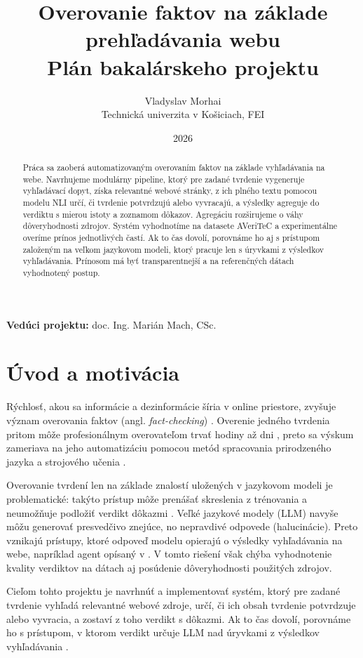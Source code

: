 \documentclass[a4paper,11pt]{article}
\title{Overovanie faktov na základe prehľadávania webu\\[0.4em]
\large Plán bakalárskeho projektu}
\author{Vladyslav Morhai\\
\small Technická univerzita v Košiciach, FEI}
\date{2026}
\begin{document}
\maketitle

\noindent\textbf{Vedúci projektu:} doc. Ing. Marián Mach, CSc.

\begin{abstract}
Práca sa zaoberá automatizovaným overovaním faktov na základe vyhľadávania
na webe. Navrhujeme modulárny pipeline, ktorý pre zadané tvrdenie vygeneruje
vyhľadávací dopyt, získa relevantné webové stránky, z ich plného textu
pomocou modelu NLI určí, či tvrdenie potvrdzujú alebo vyvracajú, a výsledky
agreguje do verdiktu s mierou istoty a zoznamom dôkazov. Agregáciu
rozširujeme o váhy dôveryhodnosti zdrojov. Systém vyhodnotíme na datasete
AVeriTeC a experimentálne overíme prínos jednotlivých častí. Ak to čas
dovolí, porovnáme ho aj s prístupom založeným na veľkom jazykovom modeli,
ktorý pracuje len s úryvkami z výsledkov vyhľadávania. Prínosom má byť
transparentnejší a na referenčných dátach vyhodnotený postup.
\end{abstract}

\section{Úvod a motivácia}

Rýchlosť, akou sa informácie a dezinformácie šíria v online priestore,
zvyšuje význam overovania faktov (angl. \textit{fact-checking})
\cite{guo2022survey}. Overenie jedného tvrdenia pritom môže profesionálnym
overovateľom trvať hodiny až dni \cite{guo2022survey}, preto sa výskum
zameriava na jeho automatizáciu pomocou metód spracovania prirodzeného
jazyka a strojového učenia \cite{guo2022survey}.

Overovanie tvrdení len na základe znalostí uložených v jazykovom modeli je
problematické: takýto prístup môže prenášať skreslenia z trénovania
a neumožňuje podložiť verdikt dôkazmi \cite{guo2022survey}. Veľké jazykové
modely (LLM) navyše môžu generovať presvedčivo znejúce, no nepravdivé
odpovede (halucinácie). Preto vznikajú prístupy, ktoré odpoveď modelu opierajú
o výsledky vyhľadávania na webe, napríklad agent opísaný v \cite{nath-agent}.
V tomto riešení však chýba vyhodnotenie kvality verdiktov na dátach aj
posúdenie dôveryhodnosti použitých zdrojov.

Cieľom tohto projektu je navrhnúť a implementovať systém, ktorý pre zadané
tvrdenie vyhľadá relevantné webové zdroje, určí, či ich obsah tvrdenie
potvrdzuje alebo vyvracia, a zostaví z toho verdikt s dôkazmi. Ak to čas
dovolí, porovnáme ho s prístupom, v ktorom verdikt určuje LLM nad úryvkami
z výsledkov vyhľadávania \cite{nath-agent}.
\end{document}
